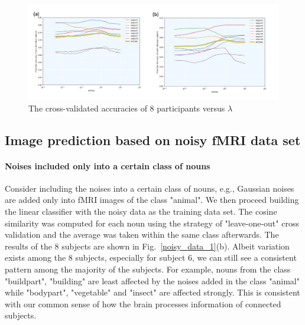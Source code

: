 \documentclass{article}
\begin{document}
\begin{figure}
\centering
\includegraphics[scale=0.15]{figure1}
\caption{The cross-validated accuracies of 8 participants versus $\lambda$}
\label{figure1}
\end{figure}


\subsection{Image prediction based on noisy fMRI data set}
\paragraph{Noises included only into a certain class of nouns} Consider including the noises into a certain class of nouns, e.g., Gaussian noises are added only into fMRI images of the class "animal". We then proceed building the linear classifier with the noisy data as the training data set. The cosine similarity was computed for each noun using the strategy of "leave-one-out" cross validation and the average was taken within the same class afterwards. The results of the 8 subjects are shown in Fig.~\ref{noisy_data_1}(b). Albeit variation exists among the 8 subjects, especially for subject 6, we can still see a consistent pattern among the majority of the subjects. For example, nouns from the class "buildpart", "building" are least affected by the noises added in the class "animal" while "bodypart", "vegetable" and "insect" are affected strongly. This is consistent with our common sense of how the brain processes information of connected subjects.
\end{document}
